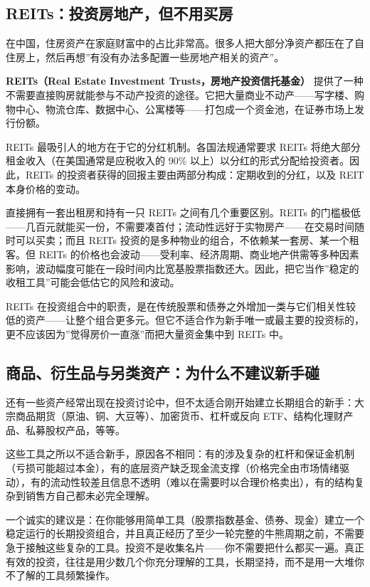 \documentclass[a4paper,11pt,oneside,fontset=none,UTF8,zihao=-4]{ctexbook}
\begin{document}
\subsection{REITs：投资房地产，但不用买房}\label{reitsux6295ux8d44ux623fux5730ux4ea7ux4f46ux4e0dux7528ux4e70ux623f}

在中国，住房资产在家庭财富中的占比非常高。很多人把大部分净资产都压在了自住房上，然后再想''有没有办法多配置一些房地产相关的资产''。

\textbf{REITs（Real Estate Investment Trusts，房地产投资信托基金）}
提供了一种不需要直接购房就能参与不动产投资的途径。它把大量商业不动产------写字楼、购物中心、物流仓库、数据中心、公寓楼等------打包成一个资金池，在证券市场上发行份额。

REITs 最吸引人的地方在于它的分红机制。各国法规通常要求 REITs
将绝大部分租金收入（在美国通常是应税收入的 90\%
以上）以分红的形式分配给投资者。因此，REITs
的投资者获得的回报主要由两部分构成：定期收到的分红，以及 REIT
本身价格的变动。

直接拥有一套出租房和持有一只 REITs 之间有几个重要区别。REITs
的门槛极低------几百元就能买一份，不需要凑首付；流动性远好于实物房产------在交易时间随时可以买卖；而且
REITs 投资的是多种物业的组合，不依赖某一套房、某一个租客。但 REITs
的价格也会波动------受利率、经济周期、商业地产供需等多种因素影响，波动幅度可能在一段时间内比宽基股票指数还大。因此，把它当作''稳定的收租工具''可能会低估它的风险和波动。

REITs
在投资组合中的职责，是在传统股票和债券之外增加一类与它们相关性较低的资产------让整个组合更多元。但它不适合作为新手唯一或最主要的投资标的，更不应该因为''觉得房价一直涨''而把大量资金集中到
REITs 中。

\subsection{商品、衍生品与另类资产：为什么不建议新手碰}\label{ux5546ux54c1ux884dux751fux54c1ux4e0eux53e6ux7c7bux8d44ux4ea7ux4e3aux4ec0ux4e48ux4e0dux5efaux8baeux65b0ux624bux78b0}

还有一些资产经常出现在投资讨论中，但不太适合刚开始建立长期组合的新手：大宗商品期货（原油、铜、大豆等）、加密货币、杠杆或反向
ETF、结构化理财产品、私募股权产品，等等。

这些工具之所以不适合新手，原因各不相同：有的涉及复杂的杠杆和保证金机制（亏损可能超过本金），有的底层资产缺乏现金流支撑（价格完全由市场情绪驱动），有的流动性较差且信息不透明（难以在需要时以合理价格卖出），有的结构复杂到销售方自己都未必完全理解。

一个诚实的建议是：在你能够用简单工具（股票指数基金、债券、现金）建立一个稳定运行的长期投资组合，并且真正经历了至少一轮完整的牛熊周期之前，不需要急于接触这些复杂的工具。投资不是收集名片------你不需要把什么都买一遍。真正有效的投资，往往是用少数几个你充分理解的工具，长期坚持，而不是用一大堆你不了解的工具频繁操作。
\end{document}
